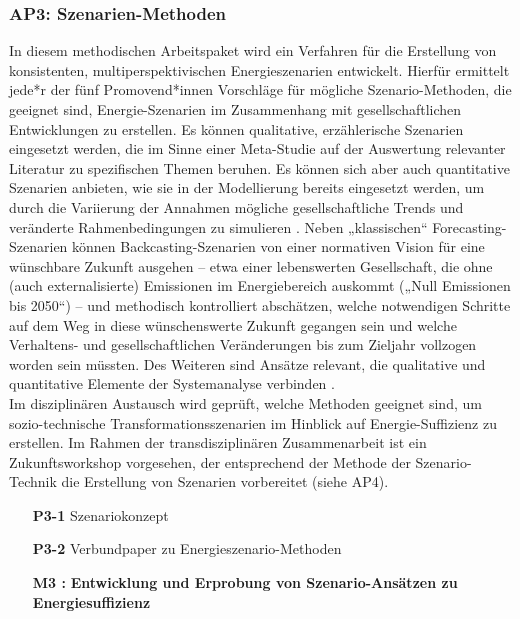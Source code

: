 \documentclass[a4paper,11pt,twoside]{scrartcl}
\begin{document}
\subsubsection*{AP3: Szenarien-Methoden}
In diesem methodischen Arbeitspaket wird ein Verfahren für die Erstellung von konsistenten, multiperspektivischen Energieszenarien entwickelt. Hierfür ermittelt jede*r der fünf Promovend*innen Vorschläge für mögliche Szenario-Methoden, die geeignet sind, Energie-Szenarien im Zusammenhang mit gesellschaftlichen Entwicklungen zu erstellen.
Es können qualitative, erzählerische Szenarien eingesetzt werden, die im Sinne einer Meta-Studie auf der Auswertung relevanter Literatur zu spezifischen Themen beruhen. Es können sich aber auch quantitative Szenarien anbieten, wie sie in der Modellierung bereits eingesetzt werden, um durch die Variierung der Annahmen mögliche gesellschaftliche Trends und veränderte Rahmenbedingungen zu simulieren \cite{Bierwirth2016}. Neben „klassischen“ Forecasting-Szenarien \cite{Kosow2008} können Backcasting-Szenarien \cite{Robinson2003,Robinson2011} von einer normativen Vision für eine wünschbare Zukunft ausgehen – etwa einer lebenswerten Gesellschaft, die ohne (auch externalisierte) Emissionen im Energiebereich auskommt („Null Emissionen bis 2050“) – und methodisch kontrolliert abschätzen, welche notwendigen Schritte auf dem Weg in diese wünschenswerte Zukunft gegangen sein und welche Verhaltens- und gesellschaftlichen Veränderungen bis zum Zieljahr vollzogen worden sein müssten. Des Weiteren sind Ansätze relevant, die qualitative und quantitative Elemente der Systemanalyse verbinden \cite{WEIMERJEHLE2016}.\\
Im disziplinären Austausch wird geprüft, welche Methoden geeignet sind, um sozio-technische Transformationsszenarien im Hinblick auf Energie-Suffizienz zu erstellen. Im Rahmen der transdisziplinären Zusammenarbeit ist ein Zukunftsworkshop vorgesehen, der entsprechend der Methode der Szenario-Technik die Erstellung von Szenarien vorbereitet (siehe AP4).
\begin{itemize}
    \item[\textbf{P3-1}] Szenariokonzept 
    \item[\textbf{P3-2}] Verbundpaper zu Energieszenario-Methoden 
    \item[\textbf{M3 :}] \textbf{Entwicklung und Erprobung von Szenario-Ansätzen zu Energiesuffizienz}
\end{itemize}
\end{document}
